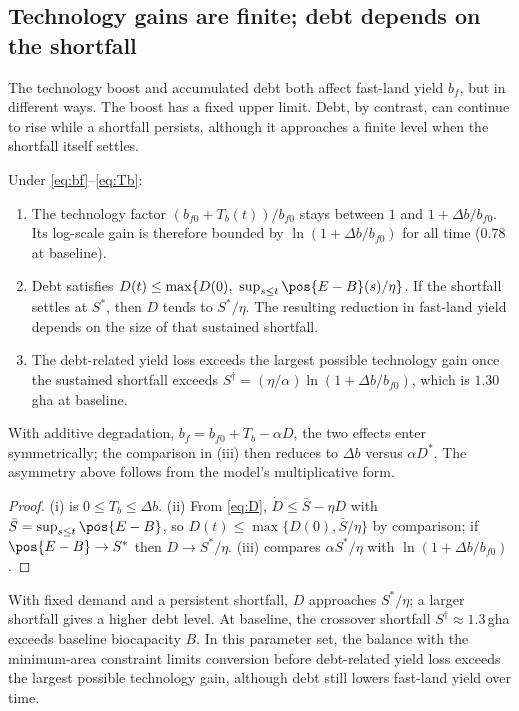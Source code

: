 \subsection{Technology gains are finite; debt depends on the shortfall}\label{sec:bounded}

The technology boost and accumulated debt both affect fast-land yield $b_f$, but in different ways. The boost has a fixed upper limit. Debt, by contrast, can continue to rise while a shortfall persists, although it approaches a finite level when the shortfall itself settles.

\begin{proposition}\label{prop:bounded}
Under \eqref{eq:bf}--\eqref{eq:Tb}:
\begin{enumerate}[label=(\roman*)]
\item The technology factor $(b_{f0}+T_b(t))/b_{f0}$ stays between $1$ and $1+\Delta b/b_{f0}$. Its log-scale gain is therefore bounded by $\ln(1+\Delta b/b_{f0})$ for all time ($0.78$ at baseline).
\item Debt satisfies $D(t)\le\max\{D(0),\ \sup_{s\le t}\pos{E-B}(s)/\eta\}$. If the shortfall settles at $S^*$, then $D$ tends to $S^*/\eta$. The resulting reduction in fast-land yield depends on the size of that sustained shortfall.
\item The debt-related yield loss exceeds the largest possible technology gain once the sustained shortfall exceeds $S^\dagger=(\eta/\alpha)\ln(1+\Delta b/b_{f0})$, which is $1.30$\,gha at baseline.
\end{enumerate}
With additive degradation, $b_f=b_{f0}+T_b-\alpha D$, the two effects enter symmetrically; the comparison in (iii) then reduces to $\Delta b$ versus $\alpha D^*$. The asymmetry above follows from the model's multiplicative form.
\end{proposition}

\begin{proof}
(i) is $0\le T_b\le\Delta b$. (ii) From \eqref{eq:D}, $\dot D\le\bar S-\eta D$ with $\bar S=\sup_{s\le t}\pos{E-B}$, so $D(t)\le\max\{D(0),\bar S/\eta\}$ by comparison; if $\pos{E-B}\to S^*$ then $D\to S^*/\eta$. (iii) compares $\alpha S^*/\eta$ with $\ln(1+\Delta b/b_{f0})$.
\end{proof}

With fixed demand and a persistent shortfall, $D$ approaches $S^*/\eta$; a larger shortfall gives a higher debt level. At baseline, the crossover shortfall $S^\dagger\approx1.3$\,gha exceeds baseline biocapacity $B$. In this parameter set, the balance with the minimum-area constraint limits conversion before debt-related yield loss exceeds the largest possible technology gain, although debt still lowers fast-land yield over time.

